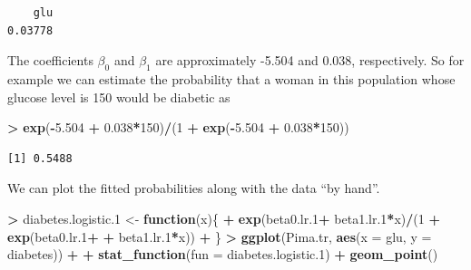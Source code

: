 \documentclass[]{krantz}
\makeatletter
\newenvironment{Shaded}{\begin{snugshade}}{\end{snugshade}}
\newcommand{\KeywordTok}[1]{\textcolor[rgb]{0.27,0.27,0.27}{\textbf{#1}}}
\newcommand{\DataTypeTok}[1]{\textcolor[rgb]{0.27,0.27,0.27}{#1}}
\newcommand{\DecValTok}[1]{\textcolor[rgb]{0.06,0.06,0.06}{#1}}
\newcommand{\FloatTok}[1]{\textcolor[rgb]{0.06,0.06,0.06}{#1}}
\newcommand{\StringTok}[1]{\textcolor[rgb]{0.5,0.5,0.5}{#1}}
\newcommand{\ControlFlowTok}[1]{\textcolor[rgb]{0.27,0.27,0.27}{\textbf{#1}}}
\newcommand{\OperatorTok}[1]{\textcolor[rgb]{0.43,0.43,0.43}{\textbf{#1}}}
\newcommand{\NormalTok}[1]{#1}
\newenvironment{kframe}{%
\medskip{}
\setlength{\fboxsep}{.8em}
 \def\at@end@of@kframe{}%
 \ifinner\ifhmode%
  \def\at@end@of@kframe{\end{minipage}}%
  \begin{minipage}{\columnwidth}%
 \fi\fi%
 \def\FrameCommand##1{\hskip\@totalleftmargin \hskip-\fboxsep
 \colorbox{shadecolor}{##1}\hskip-\fboxsep
     \hskip-\linewidth \hskip-\@totalleftmargin \hskip\columnwidth}%
 \MakeFramed {\advance\hsize-\width
   \@totalleftmargin\z@ \linewidth\hsize
   \@setminipage}}%
 {\par\unskip\endMakeFramed%
 \at@end@of@kframe}
\renewenvironment{Shaded}{\begin{kframe}}{\end{kframe}}
\makeatother
\begin{document}
\begin{verbatim}
    glu 
0.03778 
\end{verbatim}

The coefficients \(\beta_0\) and \(\beta_1\) are approximately -5.504
and 0.038, respectively. So for example we can estimate the probability
that a woman in this population whose glucose level is 150 would be
diabetic as

\begin{Shaded}
\begin{Highlighting}[]
\OperatorTok{>}\StringTok{ }\KeywordTok{exp}\NormalTok{(}\OperatorTok{-}\FloatTok{5.504} \OperatorTok{+}\StringTok{ }\FloatTok{0.038}\OperatorTok{*}\DecValTok{150}\NormalTok{)}\OperatorTok{/}\NormalTok{(}\DecValTok{1} \OperatorTok{+}\StringTok{ }\KeywordTok{exp}\NormalTok{(}\OperatorTok{-}\FloatTok{5.504} \OperatorTok{+}\StringTok{ }\FloatTok{0.038}\OperatorTok{*}\DecValTok{150}\NormalTok{))}
\end{Highlighting}
\end{Shaded}

\begin{verbatim}
[1] 0.5488
\end{verbatim}

We can plot the fitted probabilities along with the data ``by hand''.

\begin{Shaded}
\begin{Highlighting}[]
\OperatorTok{>}\StringTok{ }\NormalTok{diabetes.logistic.}\DecValTok{1}\NormalTok{ <-}\StringTok{ }\ControlFlowTok{function}\NormalTok{(x)\{}
\OperatorTok{+}\StringTok{   }\KeywordTok{exp}\NormalTok{(beta0.lr.}\DecValTok{1}\OperatorTok{+}\StringTok{ }\NormalTok{beta1.lr.}\DecValTok{1}\OperatorTok{*}\NormalTok{x)}\OperatorTok{/}\NormalTok{(}\DecValTok{1} \OperatorTok{+}\StringTok{ }\KeywordTok{exp}\NormalTok{(beta0.lr.}\DecValTok{1}\OperatorTok{+}\StringTok{ }
\OperatorTok{+}\StringTok{                                            }\NormalTok{beta1.lr.}\DecValTok{1}\OperatorTok{*}\NormalTok{x))}
\OperatorTok{+}\StringTok{ }\NormalTok{\}}
\OperatorTok{>}\StringTok{ }\KeywordTok{ggplot}\NormalTok{(Pima.tr, }\KeywordTok{aes}\NormalTok{(}\DataTypeTok{x =}\NormalTok{ glu, }\DataTypeTok{y =}\NormalTok{ diabetes)) }\OperatorTok{+}\StringTok{ }
\OperatorTok{+}\StringTok{   }\KeywordTok{stat_function}\NormalTok{(}\DataTypeTok{fun =}\NormalTok{ diabetes.logistic.}\DecValTok{1}\NormalTok{) }\OperatorTok{+}\StringTok{ }\KeywordTok{geom_point}\NormalTok{()}
\end{Highlighting}
\end{Shaded}
\end{document}
